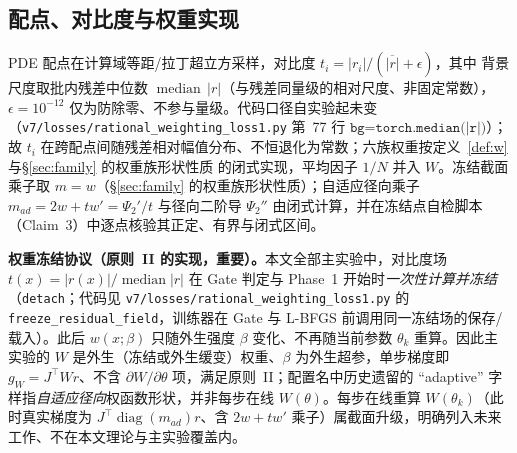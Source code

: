 \documentclass[fontset=windows,11pt]{ctexart}
\newcommand{\W}{W}
\DeclareMathOperator{\diag}{diag}
\numberwithin{equation}{section}
\begin{document}
\subsection{配点、对比度与权重实现}
PDE 配点在计算域等距/拉丁超立方采样，对比度 $t_i=|r_i|/(\overline{|r|}+\epsilon)$，其中 背景尺度取批内残差中位数 $\operatorname{median}\,|r|$（与残差同量级的相对尺度、非固定常数），$\epsilon=10^{-12}$ 仅为防除零、不参与量级。代码口径自实验起未变（\texttt{v7/\hspace{0pt}losses/\hspace{0pt}rational\_\hspace{0pt}weighting\_\hspace{0pt}loss1.py} 第~77 行 $\texttt{bg=torch.median(|r|)}$）；故 $t_i$ 在跨配点间随残差相对幅值分布、不恒退化为常数；六族权重按定义~\ref{def:w} 与\S\ref{sec:family} 的权重族形状性质 的闭式实现，平均因子 $1/N$ 并入 $\W$。冻结截面乘子取 $m=w$（\S\ref{sec:family} 的权重族形状性质）；自适应径向乘子 $m_{ad}=2w+tw'=\Psi_2'/t$ 与径向二阶导 $\Psi_2''$ 由闭式计算，并在冻结点自检脚本（Claim~3）中逐点核验其正定、有界与闭式区间。
\par\smallskip\noindent\textbf{权重冻结协议（原则~II 的实现，重要）。}本文全部主实验中，对比度场 $t(x)=|r(x)|/\operatorname{median}|r|$ 在 Gate 判定与 Phase~1 开始时\emph{一次性计算并冻结}（\texttt{detach}；代码见 \texttt{v7/\hspace{0pt}losses/\hspace{0pt}rational\_\hspace{0pt}weighting\_\hspace{0pt}loss1.py} 的 \texttt{freeze\_\hspace{0pt}residual\_\hspace{0pt}field}，训练器在 Gate 与 L-BFGS 前调用同一冻结场的保存/载入）。此后 $w(x;\beta)$ 只随外生强度 $\beta$ 变化、不再随当前参数 $\theta_k$ 重算。因此主实验的 $\W$ 是外生（冻结或外生缓变）权重、$\beta$ 为外生超参，单步梯度即 $g_\W=J^\top\W r$、不含 $\partial\W/\partial\theta$ 项，满足原则~II；配置名中历史遗留的 ``adaptive'' 字样指\emph{自适应径向}权函数形状，并非每步在线 $\W(\theta)$。每步在线重算 $\W(\theta_k)$（此时真实梯度为 $J^\top\diag(m_{ad})r$、含 $2w+tw'$ 乘子）属截面升级，明确列入未来工作、不在本文理论与主实验覆盖内。
\end{document}
